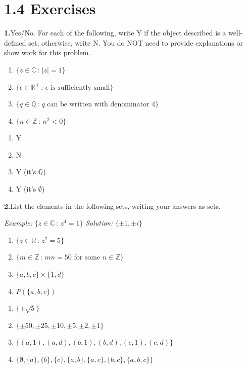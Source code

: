 \documentclass[10pt,]{book}
\theoremstyle{plain}
\theoremstyle{definition}
\theoremstyle{definition}
\theoremstyle{definition}
\theoremstyle{definition}
\numberwithin{equation}{section}
\def\Z{\mathbb{Z}}
\def\R{\mathbb{R}}
\def\Q{\mathbb{Q}}
\def\C{\mathbb{C}}
\newcommand{\lt}{<}
\begin{document}
\section*{1.4 Exercises}
\noindent\textbf{1.}\quad{}Yes/No. For each of the following, write Y if the object described is a well-defined set; otherwise, write N. You do NOT need to provide explanations or show work for this problem. \leavevmode%
\begin{enumerate}[label=(\alph*)]
\item\hypertarget{li-23}{}\(\{z \in \C \,:\, |z|=1\}\)%
\item\hypertarget{li-24}{}\(\{\epsilon \in \R^+\,:\, \epsilon \mbox{ is sufficiently small} \}\)%
\item\hypertarget{li-25}{}\(\{q\in \Q \,:\, q \mbox{ can be written  with denominator } 4\}\)%
\item\hypertarget{li-26}{}\(\{n \in \Z\,:\, n^2 \lt 0\}\)%
\end{enumerate}
%
\par\smallskip
\leavevmode%
\begin{multicols}{4}
\begin{enumerate}[label=(\alph*)]
\item\hypertarget{li-27}{}Y%
\item\hypertarget{li-28}{}N%
\item\hypertarget{li-29}{}Y (it's \(\Q\))%
\item\hypertarget{li-30}{}Y (it's \(\emptyset\))%
\end{enumerate}
\end{multicols}
\par\smallskip
\noindent\textbf{2.}\quad{}List the elements in the following sets, writing your answers as sets.%
\par
\emph{Example:} \(\{z\in \C\,:\,z^4=1\}\) \emph{Solution:} \(\{\pm 1, \pm i\}\) \leavevmode%
\begin{enumerate}[label=(\alph*)]
\item\hypertarget{li-31}{}\(\{z\in \R\,:\, z^2=5\}\)%
\item\hypertarget{li-32}{}\(\{m \in \Z\,:\, mn=50 \mbox{ for some } n\in \Z\}\)%
\item\hypertarget{li-33}{}\(\{a,b,c\}\times \{1,d\}\)%
\item\hypertarget{li-34}{}\(P(\{a,b,c\})\)%
\end{enumerate}
%
\par\smallskip
\leavevmode%
\begin{enumerate}[label=(\alph*)]
\item\hypertarget{li-35}{}\(\{\pm\sqrt{5}\}\)%
\item\hypertarget{li-36}{}\(\{\pm 50, \pm 25, \pm 10, \pm 5, \pm 2, \pm 1\}\)%
\item\hypertarget{li-37}{}\(\{(a,1),(a,d), (b,1),(b,d),(c,1),(c,d)\}\)%
\item\hypertarget{li-38}{}\(\{\emptyset, \{a\}, \{b\},
\{c\},\{a,b\},\{a,c\},\{b,c\}, \{a,b,c\}\}\)%
\end{enumerate}
\end{document}
